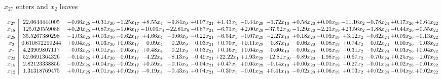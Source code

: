 \documentclass[9pt]{article}
\begin{document}
 $ x_{27} $ enters and $ x_{2} $ leaves 

 \[\begin{array}{c| c c@{\hskip 2pt} c@{\hskip 2pt} c@{\hskip 2pt} c@{\hskip 2pt} c@{\hskip 2pt} c@{\hskip 2pt} c@{\hskip 2pt} c@{\hskip 2pt} c@{\hskip 2pt} c@{\hskip 2pt} c@{\hskip 2pt} c@{\hskip 2pt} c@{\hskip 2pt} c@{\hskip 2pt} c@{\hskip 2pt} }
 x_{27}   &  22.0644444005 & -0.66 x_{25} & -0.31 x_{30} & -1.25 x_{17} & +  8.55 x_{4} & -9.84 x_{9} & +  0.07 x_{21} & +  1.43 x_{1} & -0.44 x_{29} & -1.72 x_{10} & +  0.58 x_{20} & +  0.00 x_{19} & -11.16 x_{2} & -0.78 x_{24} & +  0.17 x_{26} & +  0.64 x_{22}\\
 x_{18}   &  125.020559088 & +  0.20 x_{25} & -0.87 x_{30} & -1.06 x_{17} & -10.09 x_{4} & -22.81 x_{9} & -0.87 x_{21} & -6.71 x_{1} & +  2.00 x_{29} & -37.52 x_{10} & -1.29 x_{20} & -2.21 x_{19} & + 23.56 x_{2} & -1.88 x_{24} & -0.44 x_{26} & -0.55 x_{22}\\
 x_{28}   &  35.5267380298 & -1.03 x_{25} & +  0.03 x_{30} & -0.62 x_{17} & +  4.66 x_{4} & -9.66 x_{9} & -0.22 x_{21} & -6.54 x_{1} & -0.07 x_{29} & -2.27 x_{10} & +  0.18 x_{20} & -0.09 x_{19} & +  3.12 x_{2} & -0.62 x_{24} & +  0.09 x_{26} & -0.13 x_{22}\\
 x_{3}   &  0.610872299244 & +  0.04 x_{25} & -0.03 x_{30} & +  0.03 x_{17} & -0.09 x_{4} & -0.20 x_{9} & -0.03 x_{21} & +  0.70 x_{1} & +  0.11 x_{29} & -0.87 x_{10} & -0.06 x_{20} & -0.08 x_{19} & +  0.74 x_{2} & -0.02 x_{24} & -0.00 x_{26} & -0.03 x_{22}\\
 x_{7}   &  4.23909807117 & -0.03 x_{25} & +  0.01 x_{30} & -0.05 x_{17} & +  0.48 x_{4} & -0.21 x_{9} & -0.03 x_{21} & +  0.16 x_{1} & +  0.04 x_{29} & -0.60 x_{10} & -0.00 x_{20} & -0.08 x_{19} & -0.31 x_{2} & -0.02 x_{24} & -0.03 x_{26} & +  0.04 x_{22}\\
 x_{23}   &  52.0691364326 & -0.14 x_{25} & +  0.14 x_{30} & -0.01 x_{17} & -4.22 x_{4} & -8.13 x_{9} & -0.49 x_{21} & + 22.22 x_{1} & +  1.93 x_{29} & -12.81 x_{10} & -0.89 x_{20} & -1.98 x_{19} & +  0.67 x_{2} & -0.70 x_{24} & +  0.25 x_{26} & -1.07 x_{22}\\
 x_{15}   &  2.82123338856 & -0.02 x_{25} & +  0.04 x_{30} & -0.02 x_{17} & +  0.59 x_{4} & -0.15 x_{9} & -0.04 x_{21} & +  0.47 x_{1} & +  0.05 x_{29} & -0.14 x_{10} & +  0.00 x_{20} & -0.01 x_{19} & -0.27 x_{2} & -0.01 x_{24} & +  0.02 x_{26} & -0.01 x_{22}\\
 x_{12}   &  1.31318769475 & +  0.01 x_{25} & -0.01 x_{30} & +  0.02 x_{17} & -0.19 x_{4} & -0.43 x_{9} & +  0.04 x_{21} & -0.30 x_{1} & -0.01 x_{29} & +  0.41 x_{10} & -0.02 x_{20} & +  0.06 x_{19} & +  0.03 x_{2} & +  0.02 x_{24} & -0.04 x_{26} & +  0.02 x_{22}\\

\end{array}\]
\end{document}
